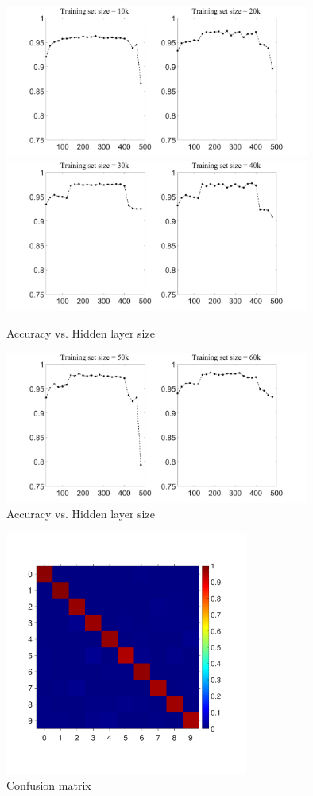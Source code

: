 \documentclass[conference]{IEEEtran}
\begin{document}
\begin{subfigures}
\begin{figure}[tmbh]
\centering
\includegraphics[width=10cm]{AccuracyHLSizeA.pdf}
\includegraphics[width=10cm]{AccuracyHLSizeB.pdf}
\caption{Accuracy vs. Hidden layer size}
\label{figure:AccuracyHLSizeA}
\end{figure}
\begin{figure}[tmbh]
\centering
\includegraphics[width=10cm]{AccuracyHLSizeC.pdf}
\caption{Accuracy vs. Hidden layer size}
\label{figure:AccuracyHLSizeB}
\end{figure}
\end{subfigures}
\begin{figure}[tmbh]
\centering
\includegraphics[width=8cm]{MatrixConfusion.pdf}
\caption{Confusion matrix}
\label{figure:MatrixConfusion}
\end{figure}
\end{document}
